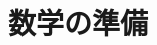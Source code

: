 \documentclass[10pt,dvipdfmx,report]{jsbook}
\begin{document}
\pagestyle{empty}

%

\chapter{数学の準備}

\end{document}
